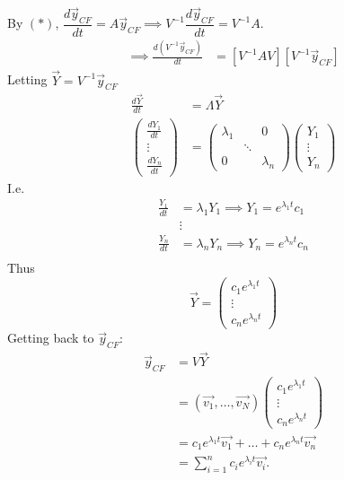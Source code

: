 \documentclass[10pt]{scrartcl}
\begin{document}
By $(*)$, $\dfrac{d\vec{y}_{CF}}{dt} = A\vec{y}_{CF}\implies V^{-1}\dfrac{d\vec{y}_{CF}}{dt} = V^{-1}A$.
\begin{align*}
\implies  \frac{d(V^{-1}\vec{y}_{CF})}{dt} &= [V^{-1}AV][V^{-1}\vec{y}_{CF}]
\end{align*}
Letting $\vec{Y} = V^{-1}\vec{y}_{CF}$
\begin{align*}
   \frac{d\vec{Y}}{dt} &= \Lambda \vec{Y}\\[.2cm]
  \begin{pmatrix}
  \frac{dY_1}{dt}\\ \vdots \\ \frac{dY_n}{dt}	
  \end{pmatrix} &=
 \begin{pmatrix}
 \lambda_1 & & 0 \\
 & \ddots & \\
 0 & & \lambda_n	
 \end{pmatrix}
 \begin{pmatrix}
 Y_1 \\ \vdots \\ Y_n	
 \end{pmatrix}
\end{align*}
I.e. 
\begin{align*}
  \frac{Y_1}{dt} &= \lambda_1Y_1 \implies Y_1 = e^{\lambda_1t}c_1\\
  &\vdots\\
    \frac{Y_n}{dt} &= \lambda_nY_n \implies Y_n = e^{\lambda_nt}c_n\\
\end{align*}
Thus
\[
  \vec{Y} = \begin{pmatrix}
 c_1e^{\lambda_1t} \\ \vdots \\ c_ne^{\lambda_nt}	
 \end{pmatrix}
\]
Getting back to $\vec{y}_{CF}$:
\begin{align*}
  \vec{y}_{CF} &= V\vec{Y}\\[-.2cm]
  &= \left(\vec{v_1},\dots,\vec{v_N}\right)\begin{pmatrix}
	 c_1e^{\lambda_1t} \\ \vdots \\ c_ne^{\lambda_nt}	
\end{pmatrix}\\[.2cm]
&= c_1e^{\lambda_1t}\vec{v_1} + \dots + c_ne^{\lambda_nt}\vec{v_n}\\
&= \sum_{i=1}^n c_ie^{\lambda_it}\vec{v_i}.
\end{align*}
\end{document}
